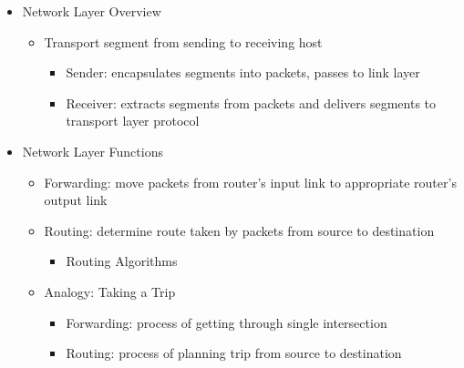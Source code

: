 \begin{itemize}

  \item Network Layer Overview

    \begin{itemize}

      \item Transport segment from sending to receiving host

        \begin{itemize}

          \item Sender: encapsulates segments into packets, passes to link layer

          \item Receiver: extracts segments from packets and delivers segments to transport layer protocol

        \end{itemize}

    \end{itemize}

  \item Network Layer Functions

    \begin{itemize}

      \item Forwarding: move packets from router's input link to appropriate router's output link

      \item Routing: determine route taken by packets from source to destination

        \begin{itemize}

          \item Routing Algorithms

        \end{itemize}

      \item Analogy: Taking a Trip

        \begin{itemize}

          \item Forwarding: process of getting through single intersection

          \item Routing: process of planning trip from source to destination

        \end{itemize}


\end{itemize}
\end{itemize}
